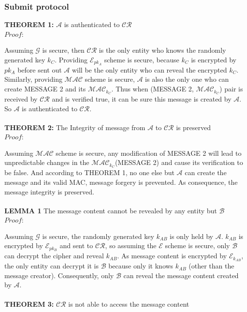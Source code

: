 \subsubsection*{Submit protocol}
\textbf{THEOREM 1:} $\mathcal{A}$ is authenticated to $\mathcal{CR}$ \\
\emph{$Proof:$} \par
Assuming $\mathcal{G}$ is secure, then $\mathcal{CR}$ is the only entity who knows the randomly generated key $k_C$. Providing $\mathcal{E}_{pk_A}$ scheme is secure, because $k_C$ is encrypted by $pk_A$ before sent out $\mathcal{A}$ will be the only entity who can reveal the encrypted $k_C$. Similarly, providing $\mathcal{MAC}$ scheme is secure, $\mathcal{A}$ is also the only one who can create MESSAGE 2 and its $\mathcal{MAC}_{k_C}$. Thus when (MESSAGE 2, $\mathcal{MAC}_{k_C}$) pair is received by $\mathcal{CR}$ and is verified true, it can be sure this message is created by $\mathcal{A}$. So $\mathcal{A}$ is authenticated to $\mathcal{CR}$.
\\
\\
\textbf{THEOREM 2:} The Integrity of message from $\mathcal{A}$ to $\mathcal{CR}$ is preserved \\
\emph{$Proof:$} \par
Assuming $\mathcal{MAC}$ scheme is secure, any modification of MESSAGE 2 will lead to unpredictable changes in the $\mathcal{MAC}_{k_C}$(MESSAGE 2) and cause its verification to be false. And according to THEOREM 1, no one else but $\mathcal{A}$ can create the message and its valid MAC, message forgery is prevented. As consequence, the message integrity is preserved.
\\
\\
\textbf{LEMMA 1} The message content cannot be revealed by any entity but $\mathcal{B}$ \\
\emph{$Proof:$} \par
Assuming $\mathcal{G}$ is secure, the randomly generated key $k_{AB}$ is only held by $\mathcal{A}$. $k_{AB}$ is encrypted by $\mathcal{E}_{pk_B}$ and sent to $\mathcal{CR}$, so assuming the $\mathcal{E}$ scheme is secure, only $\mathcal{B}$ can decrypt the cipher and reveal $k_{AB}$. As message content is encrypted by $\mathcal{E}_{k_{AB}}$, the only entity can decrypt it is $\mathcal{B}$ because only it knows $k_{AB}$ (other than the message creator). Consequently, only $\mathcal{B}$ can reveal the message content created by $\mathcal{A}$.
\\
\\
\textbf{THEOREM 3:} $\mathcal{CR}$ is not able to access the message content
